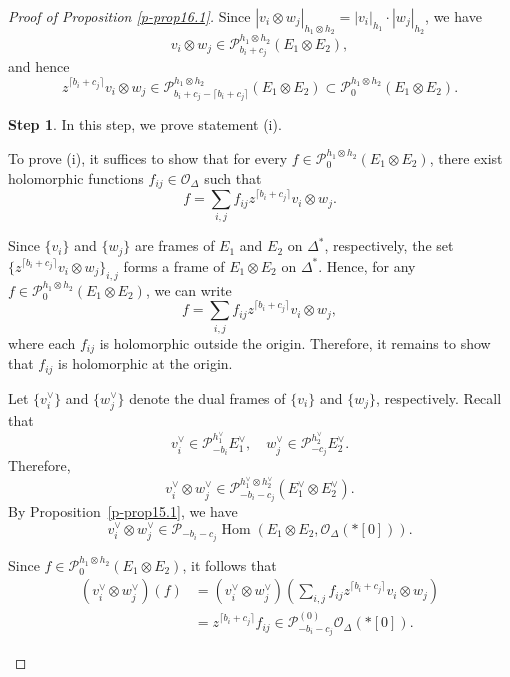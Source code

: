 \documentclass[12pt,twoside]{amsart}
\DeclareMathOperator{\Hom}{Hom}
\theoremstyle{definition}
\newtheorem{step}{Step}
\begin{document}
\begin{proof}[Proof of Proposition \ref{p-prop16.1}]
Since \( |v_i \otimes w_j|_{h_1 \otimes h_2} = |v_i|_{h_1} \cdot |w_j|_{h_2} \), we have 
\[
v_i \otimes w_j \in \mathcal{P}^{h_1 \otimes h_2}_{b_i + c_j}(E_1 \otimes E_2),
\]
and hence
\[
z^{\lceil b_i + c_j \rceil} v_i \otimes w_j \in 
\mathcal{P}^{h_1 \otimes h_2}_{b_i + c_j - \lceil b_i + c_j \rceil}(E_1 \otimes E_2) 
\subset \mathcal{P}^{h_1 \otimes h_2}_0(E_1 \otimes E_2).
\]

\setcounter{step}{0}
\begin{step}\label{p-step16.1-1} 
In this step, we prove statement (i).

To prove (i), it suffices to show that for every 
\( f \in \mathcal{P}^{h_1 \otimes h_2}_0(E_1 \otimes E_2) \), 
there exist holomorphic functions \( f_{ij} \in \mathcal{O}_\Delta \) such that
\[
f = \sum_{i,j} f_{ij} z^{\lceil b_i + c_j \rceil} v_i \otimes w_j.
\]

Since \( \{v_i\} \) and \( \{w_j\} \) are frames of 
\( E_1 \) and \( E_2 \) on \(\Delta^*\), respectively, 
the set \( \{ z^{\lceil b_i + c_j \rceil} 
v_i \otimes w_j \}_{i,j} \) forms a frame of \( E_1 \otimes E_2 \) 
on \(\Delta^*\).  
Hence, for 
any \( f \in \mathcal{P}^{h_1 \otimes h_2}_0(E_1 \otimes E_2) \), we can write
\[
f = \sum_{i,j} f_{ij} z^{\lceil b_i + c_j \rceil} v_i \otimes w_j,
\]
where each \( f_{ij} \) is holomorphic outside the origin.  
Therefore, it remains to show that \( f_{ij} \) is holomorphic at the origin.

Let \( \{v_i^\vee\} \) and \( \{w_j^\vee\} \) 
denote the dual frames of \( \{v_i\} \) and \( \{w_j\} \), respectively.  
Recall that 
\[
v_i^\vee \in \mathcal{P}^{h_1^\vee}_{-b_i} E_1^\vee, \quad 
w_j^\vee \in \mathcal{P}^{h_2^\vee}_{-c_j} E_2^\vee.
\]
Therefore,
\[
v_i^\vee \otimes w_j^\vee \in 
\mathcal{P}^{h_1^\vee \otimes h_2^\vee}_{-b_i - c_j}(E_1^\vee \otimes E_2^\vee).
\]
By Proposition~\ref{p-prop15.1}, we have
\[
v_i^\vee \otimes w_j^\vee \in 
\mathcal{P}_{-b_i - c_j} \Hom(E_1 \otimes E_2, \mathcal{O}_\Delta(*[0])).
\]

Since \( f \in \mathcal{P}^{h_1 \otimes h_2}_0(E_1 \otimes E_2) \), it follows that
\begin{align*}
(v_i^\vee \otimes w_j^\vee)(f) 
&= (v_i^\vee \otimes w_j^\vee)\left( \sum_{i,j} f_{ij} 
z^{\lceil b_i + c_j \rceil} v_i \otimes w_j \right) \\
&= z^{\lceil b_i + c_j \rceil} f_{ij} 
\in \mathcal{P}^{(0)}_{-b_i - c_j} \mathcal{O}_\Delta(*[0]).
\end{align*}


\end{step}
\end{proof}
\end{document}
